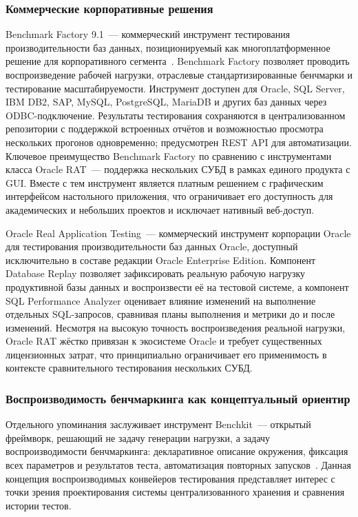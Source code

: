 \subsubsection{Коммерческие корпоративные решения}

Benchmark Factory 9.1~--- коммерческий инструмент тестирования производительности баз данных, позиционируемый как многоплатформенное решение для корпоративного сегмента~\cite{benchmarkfactory_91}. Benchmark Factory позволяет проводить воспроизведение рабочей нагрузки, отраслевые стандартизированные бенчмарки и тестирование масштабируемости. Инструмент доступен для Oracle, SQL Server, IBM DB2, SAP, MySQL, PostgreSQL, MariaDB и других баз данных через ODBC-подключение. Результаты тестирования сохраняются в централизованном репозитории с поддержкой встроенных отчётов и возможностью просмотра нескольких прогонов одновременно; предусмотрен REST API для автоматизации. Ключевое преимущество Benchmark Factory по сравнению с инструментами класса Oracle RAT~--- поддержка нескольких СУБД в рамках единого продукта с GUI. Вместе с тем инструмент является платным решением с графическим интерфейсом настольного приложения, что ограничивает его доступность для академических и небольших проектов и исключает нативный веб-доступ.

Oracle Real Application Testing~--- коммерческий инструмент корпорации Oracle для тестирования производительности баз данных Oracle, доступный исключительно в составе редакции Oracle Enterprise Edition. Компонент Database Replay позволяет зафиксировать реальную рабочую нагрузку продуктивной базы данных и воспроизвести её на тестовой системе, а компонент SQL Performance Analyzer оценивает влияние изменений на выполнение отдельных SQL-запросов, сравнивая планы выполнения и метрики до и после изменений. Несмотря на высокую точность воспроизведения реальной нагрузки, Oracle RAT жёстко привязан к экосистеме Oracle и требует существенных лицензионных затрат, что принципиально ограничивает его применимость в контексте сравнительного тестирования нескольких СУБД.

\subsubsection{Воспроизводимость бенчмаркинга как концептуальный ориентир}

Отдельного упоминания заслуживает инструмент Benchkit~--- открытый фреймворк, решающий не задачу генерации нагрузки, а задачу воспроизводимости бенчмаркинга: декларативное описание окружения, фиксация всех параметров и результатов теста, автоматизация повторных запусков~\cite{benchkit_exasol}. Данная концепция воспроизводимых конвейеров тестирования представляет интерес с точки зрения проектирования системы централизованного хранения и сравнения истории тестов.

